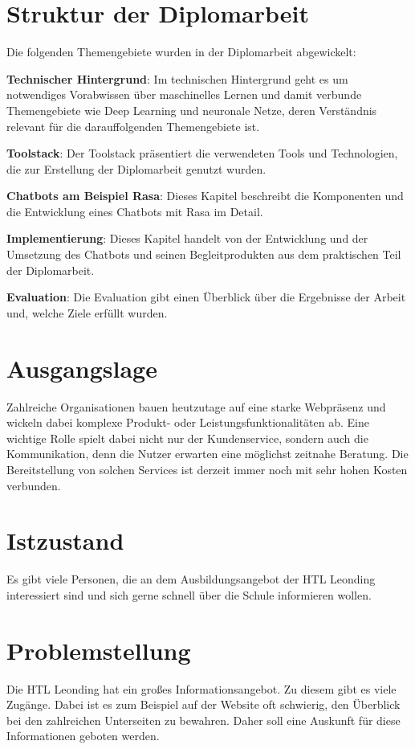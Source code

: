 \section{Struktur der Diplomarbeit}

Die folgenden Themengebiete wurden in der Diplomarbeit abgewickelt:

\textbf{Technischer Hintergrund}: Im technischen Hintergrund geht es um notwendiges Vorabwissen über maschinelles Lernen und damit verbunde Themengebiete wie Deep Learning und neuronale Netze, deren Verständnis relevant für die darauffolgenden Themengebiete ist.

\textbf{Toolstack}: Der Toolstack präsentiert die verwendeten Tools und Technologien, die zur Erstellung der Diplomarbeit genutzt wurden.

\textbf{Chatbots am Beispiel Rasa}: Dieses Kapitel beschreibt die Komponenten und die Entwicklung eines Chatbots mit Rasa im Detail.

\textbf{Implementierung}: Dieses Kapitel handelt von der Entwicklung und der Umsetzung des Chatbots und seinen Begleitprodukten aus dem praktischen Teil der Diplomarbeit.

\textbf{Evaluation}: Die Evaluation gibt einen Überblick über die Ergebnisse der Arbeit und, welche Ziele erfüllt wurden.



\section{Ausgangslage}

Zahlreiche Organisationen bauen heutzutage auf eine starke Webpräsenz und wickeln dabei komplexe Produkt\-- oder Leistungsfunktionalitäten ab.
Eine wichtige Rolle spielt dabei nicht nur der Kundenservice, sondern auch die Kommunikation, denn die Nutzer erwarten eine möglichst zeitnahe Beratung.
Die Bereitstellung von solchen Services ist derzeit immer noch mit sehr hohen Kosten verbunden.

\section{Istzustand}
Es gibt viele Personen, die an dem Ausbildungsangebot der HTL Leonding interessiert sind und sich gerne schnell über die Schule informieren wollen.


\section{Problemstellung}
Die HTL Leonding hat ein großes Informationsangebot.
Zu diesem gibt es viele Zugänge.
Dabei ist es zum Beispiel auf der Website oft schwierig, den Überblick bei den zahlreichen Unterseiten zu bewahren.
Daher soll eine Auskunft für diese Informationen geboten werden.

